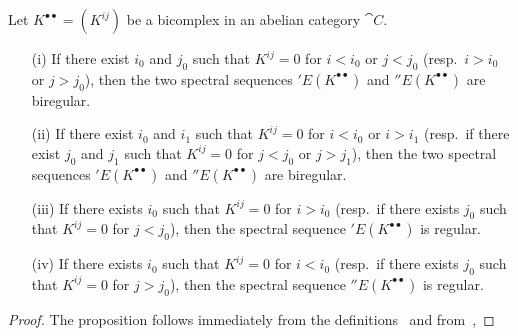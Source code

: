 \begin{proposition}[11.3.3]
\label{0.11.3.3}
Let $K^{\bullet\bullet}=(K^{ij})$ be a bicomplex in an abelian category $\cat{C}$.
\begin{enumerate}
  \item[{\rm(i)}] If there exist $i_0$ and $j_0$ such that $K^{ij}=0$ for $i<i_0$ or $j<j_0$ (resp.~$i>i_0$ or $j>j_0$), then the two spectral sequences $'E(K^{\bullet\bullet})$ and $''E(K^{\bullet\bullet})$ are biregular.
  \item[{\rm(ii)}] If there exist $i_0$ and $i_1$ such that $K^{ij}=0$ for $i<i_0$ or $i>i_1$ (resp.~if there exist $j_0$ and $j_1$ such that $K^{ij}=0$ for $j<j_0$ or $j>j_1$), then the two spectral sequences $'E(K^{\bullet\bullet})$ and $''E(K^{\bullet\bullet})$ are biregular.
  \item[{\rm(iii)}] If there exists $i_0$ such that $K^{ij}=0$ for $i>i_0$ (resp.~if there exists $j_0$ such that $K^{ij}=0$ for $j<j_0$), then the spectral sequence $'E(K^{\bullet\bullet})$ is regular.
  \item[{\rm(iv)}] If there exists $i_0$ such that $K^{ij}=0$ for $i<i_0$ (resp.~if there exists $j_0$ such that $K^{ij}=0$ for $j>j_0$), then the spectral sequence $''E(K^{\bullet\bullet})$ is regular.
\end{enumerate}
\end{proposition}

\begin{proof}
The proposition follows immediately from the definitions~ and from~, 
\end{proof}

